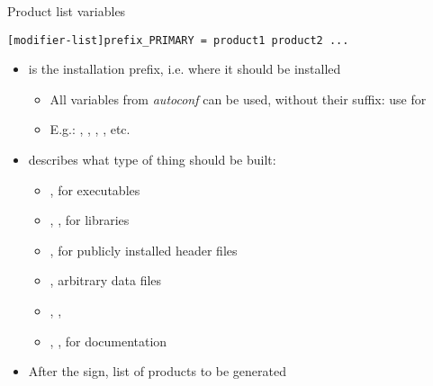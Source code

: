 \begin{frame}[fragile]{Product list variables}

    \begin{block}{}
{\small
\begin{verbatim}
[modifier-list]prefix_PRIMARY = product1 product2 ...
\end{verbatim}}
\end{block}

  \begin{itemize}

\item {} is the installation prefix, i.e. where it should be
  installed
  \begin{itemize}
  \item All  variables from {\em autoconf} can be used,
    without their  suffix: use  for 
  \item E.g.: , , ,
    , etc.
  \end{itemize}

\item {} describes what type of thing should be built:
  \begin{itemize}
  \item {}, for executables
  \item {}, , for libraries
  \item {}, for publicly installed header files
  \item {}, arbitrary data files
  \item {}, , 
  \item {}, , for documentation
  \end{itemize}

\item After the \code{=} sign, list of products to be generated

\end{itemize}

\end{frame}

